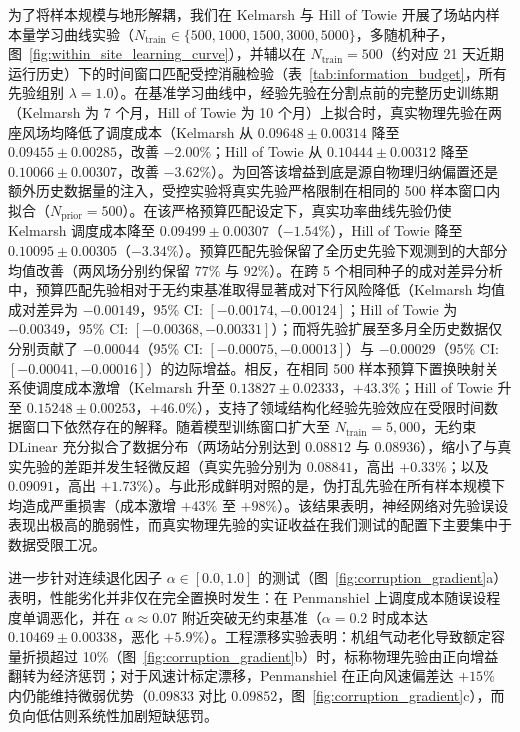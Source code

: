 为了将样本规模与地形解耦，我们在 Kelmarsh 与 Hill of Towie 开展了场站内样本量学习曲线实验（$N_{\text{train}} \in \{500, 1000, 1500, 3000, 5000\}$，多随机种子，图~\ref{fig:within_site_learning_curve}），并辅以在 $N_{\text{train}} = 500$（约对应 21 天近期运行历史）下的时间窗口匹配受控消融检验（表~\ref{tab:information_budget}，所有先验组别 $\lambda=1.0$）。在基准学习曲线中，经验先验在分割点前的完整历史训练期（Kelmarsh 为 7 个月，Hill of Towie 为 10 个月）上拟合时，真实物理先验在两座风场均降低了调度成本（Kelmarsh 从 $0.09648 \pm 0.00314$ 降至 $0.09455 \pm 0.00285$，改善 $-2.00\%$；Hill of Towie 从 $0.10444 \pm 0.00312$ 降至 $0.10066 \pm 0.00307$，改善 $-3.62\%$）。为回答该增益到底是源自物理归纳偏置还是额外历史数据量的注入，受控实验将真实先验严格限制在相同的 500 样本窗口内拟合（$N_{\text{prior}}=500$）。在该严格预算匹配设定下，真实功率曲线先验仍使 Kelmarsh 调度成本降至 $0.09499 \pm 0.00307$（$-1.54\%$），Hill of Towie 降至 $0.10095 \pm 0.00305$（$-3.34\%$）。预算匹配先验保留了全历史先验下观测到的大部分均值改善（两风场分别约保留 $77\%$ 与 $92\%$）。在跨 5 个相同种子的成对差异分析中，预算匹配先验相对于无约束基准取得显著成对下行风险降低（Kelmarsh 均值成对差异为 $-0.00149$，95\% CI: $[-0.00174, -0.00124]$；Hill of Towie 为 $-0.00349$，95\% CI: $[-0.00368, -0.00331]$）；而将先验扩展至多月全历史数据仅分别贡献了 $-0.00044$（95\% CI: $[-0.00075, -0.00013]$）与 $-0.00029$（95\% CI: $[-0.00041, -0.00016]$）的边际增益。相反，在相同 500 样本预算下置换映射关系使调度成本激增（Kelmarsh 升至 $0.13827 \pm 0.02333$，$+43.3\%$；Hill of Towie 升至 $0.15248 \pm 0.00253$，$+46.0\%$），支持了领域结构化经验先验效应在受限时间数据窗口下依然存在的解释。随着模型训练窗口扩大至 $N_{\text{train}} = 5{,}000$，无约束 DLinear 充分拟合了数据分布（两场站分别达到 $0.08812$ 与 $0.08936$），缩小了与真实先验的差距并发生轻微反超（真实先验分别为 $0.08841$，高出 $+0.33\%$；以及 $0.09091$，高出 $+1.73\%$）。与此形成鲜明对照的是，伪打乱先验在所有样本规模下均造成严重损害（成本激增 $+43\%$ 至 $+98\%$）。该结果表明，神经网络对先验误设表现出极高的脆弱性，而真实物理先验的实证收益在我们测试的配置下主要集中于数据受限工况。



进一步针对连续退化因子 $\alpha \in [0.0, 1.0]$ 的测试（图~\ref{fig:corruption_gradient}a）表明，性能劣化并非仅在完全置换时发生：在 Penmanshiel 上调度成本随误设程度单调恶化，并在 $\alpha \approx 0.07$ 附近突破无约束基准（$\alpha=0.2$ 时成本达 $0.10469 \pm 0.00338$，恶化 $+5.9\%$）。工程漂移实验表明：机组气动老化导致额定容量折损超过 10\%（图~\ref{fig:corruption_gradient}b）时，标称物理先验由正向增益翻转为经济惩罚；对于风速计标定漂移，Penmanshiel 在正向风速偏差达 $+15\%$ 内仍能维持微弱优势（$0.09833$ 对比 $0.09852$，图~\ref{fig:corruption_gradient}c），而负向低估则系统性加剧短缺惩罚。

